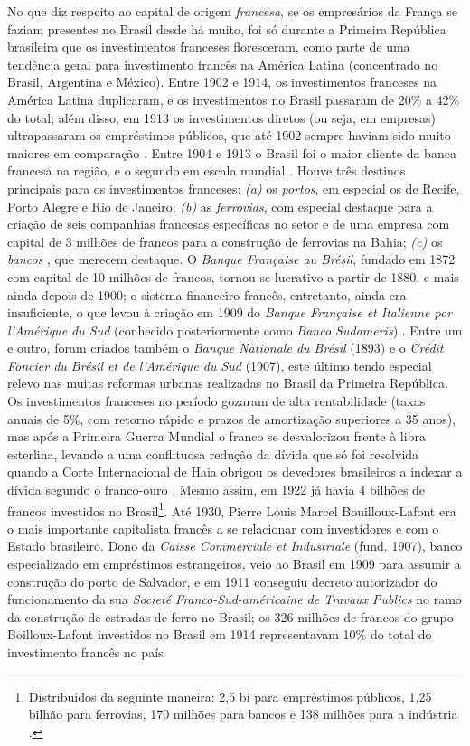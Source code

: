 No que diz respeito ao capital de origem \textit{francesa}, se os empresários da França se faziam presentes no Brasil desde há muito, foi só durante a Primeira República brasileira que os investimentos franceses floresceram, como parte de uma tendência geral para investimento francês na América Latina (concentrado no Brasil, Argentina e México). Entre 1902 e 1914, os investimentos franceses na América Latina duplicaram, e os investimentos no Brasil passaram de 20\% a 42\% do total; além disso, em 1913 os investimentos diretos (ou seja, em empresas) ultrapassaram os empréstimos públicos, que até 1902 sempre haviam sido muito maiores em comparação \cite[p~83-84]{mauro_empfran_1999}. Entre 1904 e 1913 o Brasil foi o maior cliente da banca francesa na região, e o segundo em escala mundial \cite{rippy_french_1949}. Houve três destinos principais para os investimentos franceses: \textit{(a)} os \textit{portos}, em especial os de Recife, Porto Alegre e Rio de Janeiro; \textit{(b)} as \textit{ferrovias}, com especial destaque para a criação de seis companhias francesas específicas no setor e de uma empresa com capital de 3 milhões de francos para a construção de ferrovias na Bahia; \textit{(c)} os \textit{bancos} \cite[p~84]{mauro_empfran_1999}, que merecem destaque. O \textit{Banque Française au Brésil}, fundado em 1872 com capital de 10 milhões de francos, tornou-se lucrativo a partir de 1880, e mais ainda depois de 1900; o sistema financeiro francês, entretanto, ainda era insuficiente, o que levou à criação em 1909 do \textit{Banque Française et Italienne por l'Amérique du Sud} (conhecido posteriormente como \textit{Banco Sudameris}) \cite[p~84]{mauro_empfran_1999}. Entre um e outro, foram criados também o \textit{Banque Nationale du Brésil} (1893) e o \textit{Crédit Foncier du Brésil et de l'Amérique du Sud} (1907), este último tendo especial relevo nas muitas reformas urbanas realizadas no Brasil da Primeira República. Os investimentos franceses no período gozaram de alta rentabilidade (taxas anuais de 5\%, com retorno rápido e prazos de amortização superiores a 35 anos), mas após a Primeira Guerra Mundial o franco se desvalorizou frente à libra esterlina, levando a uma conflituosa redução da dívida que só foi resolvida quando a Corte Internacional de Haia obrigou os devedores brasileiros a indexar a dívida segundo o franco-ouro \cite[p.~87]{mauro_empfran_1999}. Mesmo assim, em 1922 já havia 4 bilhões de francos investidos no Brasil\footnote{Distribuídos da seguinte maneira: 2,5 bi para empréstimos públicos, 1,25 bilhão para ferrovias, 170 milhões para bancos e 138 milhões para a indústria \cite[p~84]{mauro_empfran_1999}.}. Até 1930, Pierre Louis Marcel Bouilloux-Lafont era o mais importante capitalista francês a se relacionar com investidores e com o Estado brasileiro. Dono da \textit{Caisse Commerciale et Industriale} (fund. 1907), banco especializado em empréstimos estrangeiros, veio ao Brasil em 1909 para assumir a construção do porto de Salvador, e em 1911 conseguiu decreto autorizador do funcionamento da sua \textit{Societé Franco-Sud-américaine de Travaux Publics} no ramo da construção de estradas de ferro no Brasil; os 326 milhões de francos do grupo Boilloux-Lafont investidos no Brasil em 1914 representavam 10\% do total do investimento francês no país 